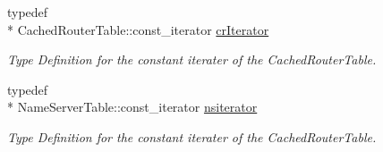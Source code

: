 \begin{DoxyCompactItemize}
typedef \\*
Cached\-Router\-Table\-::const\-\_\-iterator \hyperlink{namespacens3_a0d17c0f2e1efb713fe4a62d283039f06}{cr\-Iterator}
\begin{DoxyCompactList}\small\item\em Type Definition for the constant iterater of the Cached\-Router\-Table. \end{DoxyCompactList}\item 
typedef \\*
Name\-Server\-Table\-::const\-\_\-iterator \hyperlink{namespacens3_a81ca04d4bcf5358cad6f7b2d7fd0fe2a}{nsiterator}
\begin{DoxyCompactList}\small\item\em Type Definition for the constant iterater of the Cached\-Router\-Table. \end{DoxyCompactList}\end{DoxyCompactItemize}
